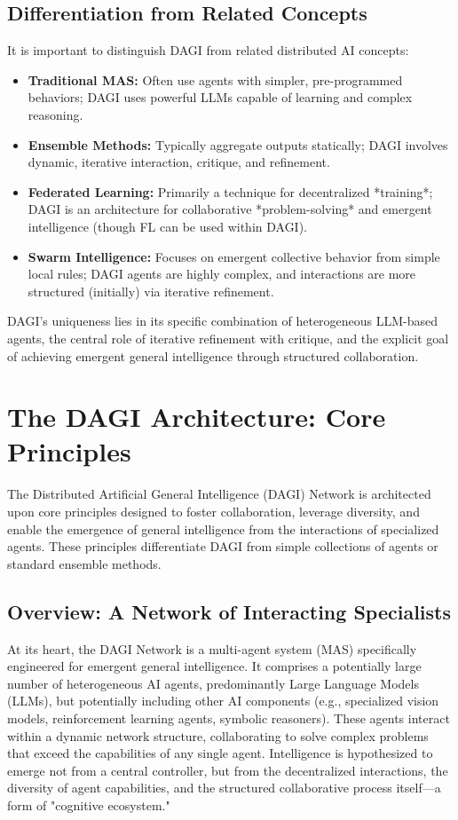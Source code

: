 \documentclass[12pt]{amsart}
\begin{document}
\subsection{Differentiation from Related Concepts}
It is important to distinguish DAGI from related distributed AI concepts:
\begin{itemize}[leftmargin=*]
    \item \textbf{Traditional MAS:} Often use agents with simpler, pre-programmed behaviors; DAGI uses powerful LLMs capable of learning and complex reasoning.
    \item \textbf{Ensemble Methods:} Typically aggregate outputs statically; DAGI involves dynamic, iterative interaction, critique, and refinement.
    \item \textbf{Federated Learning:} Primarily a technique for decentralized *training*; DAGI is an architecture for collaborative *problem-solving* and emergent intelligence (though FL can be used within DAGI).
    \item \textbf{Swarm Intelligence:} Focuses on emergent collective behavior from simple local rules; DAGI agents are highly complex, and interactions are more structured (initially) via iterative refinement.
\end{itemize}
DAGI's uniqueness lies in its specific combination of heterogeneous LLM-based agents, the central role of iterative refinement with critique, and the explicit goal of achieving emergent general intelligence through structured collaboration.

\section{The DAGI Architecture: Core Principles}
\label{sec:architecture}
The Distributed Artificial General Intelligence (DAGI) Network is architected upon core principles designed to foster collaboration, leverage diversity, and enable the emergence of general intelligence from the interactions of specialized agents. These principles differentiate DAGI from simple collections of agents or standard ensemble methods.

\subsection{Overview: A Network of Interacting Specialists}
At its heart, the DAGI Network is a multi-agent system (MAS) specifically engineered for emergent general intelligence. It comprises a potentially large number of heterogeneous AI agents, predominantly Large Language Models (LLMs), but potentially including other AI components (e.g., specialized vision models, reinforcement learning agents, symbolic reasoners). These agents interact within a dynamic network structure, collaborating to solve complex problems that exceed the capabilities of any single agent. Intelligence is hypothesized to emerge not from a central controller, but from the decentralized interactions, the diversity of agent capabilities, and the structured collaborative process itself—a form of "cognitive ecosystem."
\end{document}
